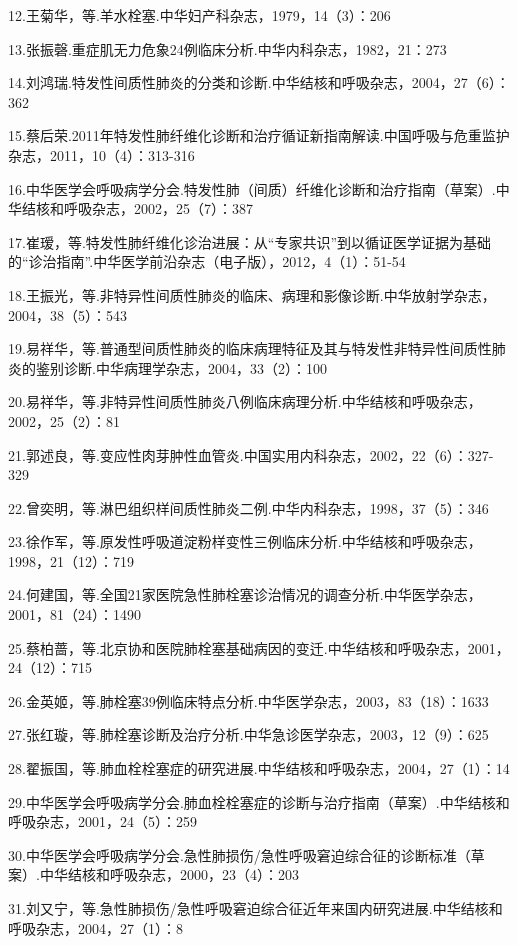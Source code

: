12.王菊华，等.羊水栓塞.中华妇产科杂志，1979，14（3）：206

13.张振磬.重症肌无力危象24例临床分析.中华内科杂志，1982，21：273

14.刘鸿瑞.特发性间质性肺炎的分类和诊断.中华结核和呼吸杂志，2004，27（6）：362

15.蔡后荣.2011年特发性肺纤维化诊断和治疗循证新指南解读.中国呼吸与危重监护杂志，2011，10（4）：313-316

16.中华医学会呼吸病学分会.特发性肺（间质）纤维化诊断和治疗指南（草案）.中华结核和呼吸杂志，2002，25（7）：387

17.崔瑷，等.特发性肺纤维化诊治进展：从“专家共识”到以循证医学证据为基础的“诊治指南”.中华医学前沿杂志（电子版），2012，4（1）：51-54

18.王振光，等.非特异性间质性肺炎的临床、病理和影像诊断.中华放射学杂志，2004，38（5）：543

19.易祥华，等.普通型间质性肺炎的临床病理特征及其与特发性非特异性间质性肺炎的鉴别诊断.中华病理学杂志，2004，33（2）：100

20.易祥华，等.非特异性间质性肺炎八例临床病理分析.中华结核和呼吸杂志，2002，25（2）：81

21.郭述良，等.变应性肉芽肿性血管炎.中国实用内科杂志，2002，22（6）：327-329

22.曾奕明，等.淋巴组织样间质性肺炎二例.中华内科杂志，1998，37（5）：346

23.徐作军，等.原发性呼吸道淀粉样变性三例临床分析.中华结核和呼吸杂志，1998，21（12）：719

24.何建国，等.全国21家医院急性肺栓塞诊治情况的调查分析.中华医学杂志，2001，81（24）：1490

25.蔡柏蔷，等.北京协和医院肺栓塞基础病因的变迁.中华结核和呼吸杂志，2001，24（12）：715

26.金英姬，等.肺栓塞39例临床特点分析.中华医学杂志，2003，83（18）：1633

27.张红璇，等.肺栓塞诊断及治疗分析.中华急诊医学杂志，2003，12（9）：625

28.翟振国，等.肺血栓栓塞症的研究进展.中华结核和呼吸杂志，2004，27（1）：14

29.中华医学会呼吸病学分会.肺血栓栓塞症的诊断与治疗指南（草案）.中华结核和呼吸杂志，2001，24（5）：259

30.中华医学会呼吸病学分会.急性肺损伤/急性呼吸窘迫综合征的诊断标准（草案）.中华结核和呼吸杂志，2000，23（4）：203

31.刘又宁，等.急性肺损伤/急性呼吸窘迫综合征近年来国内研究进展.中华结核和呼吸杂志，2004，27（1）：8

